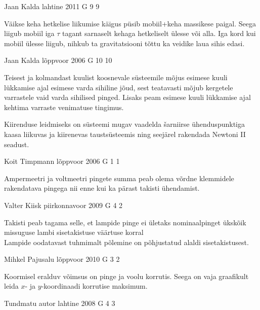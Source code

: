 \documentclass[11pt, twoside]{article}
\begin{document}
{%
{Jaan Kalda} %
{lahtine} %
{2011} %
{G 9} %
{9} %
{

\ifHint
Väikse keha hetkelise liikumise käigus püsib mobiil+keha massikese paigal. Seega liigub mobiil iga $\tau$ tagant sarnaselt kehaga hetkeliselt ülesse või alla. Iga kord kui mobiil ülesse liigub, nihkub ta gravitatsiooni tõttu ka veidike laua sihis edasi.
\fi
}

{Jaan Kalda} %
{lõppvoor} %
{2006} %
{G 10} %
{10} %
{

\ifHint
Teisest ja kolmandast kuulist koosnevale süsteemile mõjus esimese kuuli lükkamise ajal esimese varda sihiline jõud, sest teatavasti mõjub kergetele varrastele vaid varda sihilised pinged. Lisaks peam esimese kuuli lükkamise ajal kehtima varraste venimatuse tingimus.

Kiirenduse leidmiseks on süsteemi mugav vaadelda šarniirse ühenduspunktiga kaasa liikuvas ja kiirenevas taustsüsteemis ning seejärel rakendada Newtoni II seadust.
\fi
}

{Koit Timpmann} %
{lõppvoor} %
{2006} %
{G 1} %
{1} %
{

\ifHint
Ampermeetri ja voltmeetri pingete summa peab olema võrdne klemmidele rakendatava pingega nii enne kui ka pärast takisti ühendamist.
\fi
}

{Valter Kiisk} %
{piirkonnavoor} %
{2009} %
{G 4} %
{2} %
{

\ifHint
\osa Takisti peab tagama selle, et lampide pinge ei ületaks nominaalpinget ükskõik missuguse lambi sisetakistuse väärtuse korral\\
\osa Lampide oodatavast tuhmimalt põlemine on põhjustatud alaldi sisetakistusest.
\fi
}

{Mihkel Pajusalu} %
{lõppvoor} %
{2010} %
{G 3} %
{2} %
{

\ifHint
Koormisel eralduv võimsus on pinge ja voolu korrutis. Seega on vaja graafikult leida $x$- ja $y$-koordinaadi korrutise maksimum.
\fi
}

{Tundmatu autor} %
{lahtine} %
{2008} %
{G 4} %
{3} %
{

}}
\end{document}
